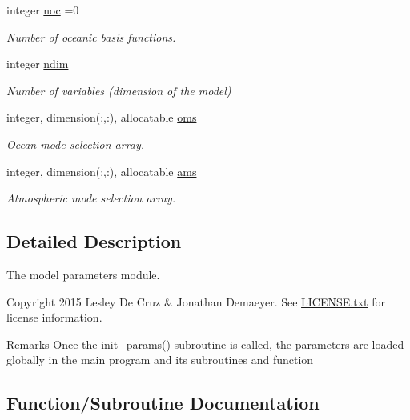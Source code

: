\begin{DoxyCompactItemize}
integer \hyperlink{namespaceparams_acdb6ef89bcada9ba7b6b6bba575b60f4}{noc} =0
\begin{DoxyCompactList}\small\item\em Number of oceanic basis functions. \end{DoxyCompactList}\item 
integer \hyperlink{namespaceparams_a2323fe1773f086e20c14f266351c482b}{ndim}
\begin{DoxyCompactList}\small\item\em Number of variables (dimension of the model) \end{DoxyCompactList}\item 
integer, dimension(\+:,\+:), allocatable \hyperlink{namespaceparams_a5e25e072992d5908eea5308243b7ec63}{oms}
\begin{DoxyCompactList}\small\item\em Ocean mode selection array. \end{DoxyCompactList}\item 
integer, dimension(\+:,\+:), allocatable \hyperlink{namespaceparams_aa95299f1a9c54693b85e049004369089}{ams}
\begin{DoxyCompactList}\small\item\em Atmospheric mode selection array. \end{DoxyCompactList}\end{DoxyCompactItemize}


\subsection{Detailed Description}
The model parameters module. 

\begin{DoxyCopyright}{Copyright}
2015 Lesley De Cruz \& Jonathan Demaeyer. See \hyperlink{LICENSE_8txt}{L\+I\+C\+E\+N\+S\+E.\+txt} for license information. 
\end{DoxyCopyright}
\begin{DoxyRemark}{Remarks}
Once the \hyperlink{namespaceparams_aa5d1f7f88b00cf3705691de2f6f92a08}{init\+\_\+params()} subroutine is called, the parameters are loaded globally in the main program and its subroutines and function 
\end{DoxyRemark}


\subsection{Function/\+Subroutine Documentation}

